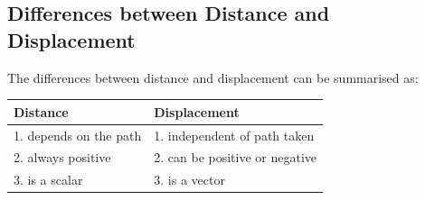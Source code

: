             \subsection*{Differences between Distance and Displacement}
            \nopagebreak
        \label{m38788*id63938}The differences between distance and displacement can be summarised as:\par 
\begin{center}
\begin{tabular}{|l|l|}\hline
\textbf{ Distance } & \textbf{ Displacement } \\\hline
1. depends on the path & 1. independent of path taken \\\hline
2. always positive & 2. can be positive or negative \\\hline
3. is a scalar & 3. is a vector\\\hline
\end{tabular}
\end{center}
    \par
\label{m38788*secfhsst!!!underscore!!!id498}
